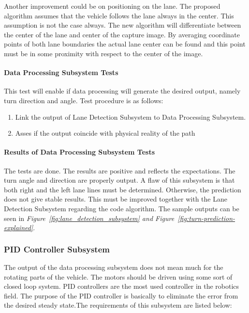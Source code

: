 \documentclass[a4paper,12pt]{article}
\begin{document}
		Another improvement could be on positioning on the lane. The proposed algorithm assumes that the vehicle follows the lane always in the center. This assumption is not the case always. The new algorithm will differentiate between the center of the lane and center of the capture image. By averaging coordinate points of both lane boundaries the actual lane center can be found and this point must be in some proximity with respect to the center of the image.
		
	\paragraph{Data Processing Subsystem Tests}	
		This test will enable if data processing will generate the desired output, namely turn direction and angle. Test procedure is as follows:
		\begin{enumerate}
			\item Link the output of Lane Detection Subsystem to Data Processing Subsystem. \vspace{-0.2cm}
			\item Asses if the output coincide with physical reality of the path \vspace{-0.2cm}
		\end{enumerate}
	\paragraph{Results of Data Processing Subsystem Tests}
	The tests are done. The results are positive and reflects the expectations. The turn angle and direction are properly output. A flaw of this subsystem is that both right and the left lane lines must be determined. Otherwise, the prediction does not give stable results. This must be improved together with the Lane Detection Subsystem regarding the code algorithm.	The sample outputs can be seen in \textit{Figure~\ref{fig:lane_detection_subsystem} and Figure~\ref{fig:turn-prediction-explained}}.
	
	\subsubsection{PID Controller Subsystem}
	
	The output of the data processing subsystem does not mean much for the rotating parts of the vehicle. The motors should be driven using some sort of closed loop system. PID controllers are the most used controller in the robotics field. The purpose of the PID controller is basically to eliminate the error from the desired steady state.The requirements of this subsystem are listed below:
	
\end{document}
